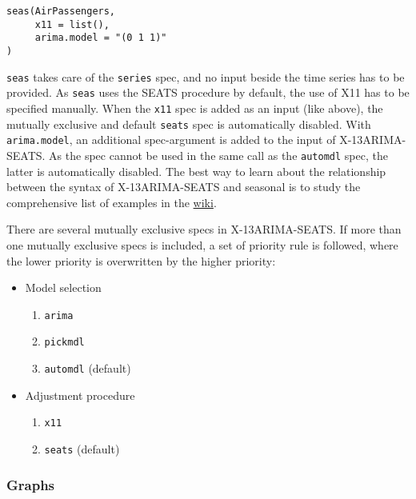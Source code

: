 \begin{verbatim}
seas(AirPassengers,
     x11 = list(),
     arima.model = "(0 1 1)"
)
\end{verbatim}

\texttt{seas} takes care of the \texttt{series} spec, and no input
beside the time series has to be provided. As \texttt{seas} uses the
SEATS procedure by default, the use of X11 has to be specified manually.
When the \texttt{x11} spec is added as an input (like above), the
mutually exclusive and default \texttt{seats} spec is automatically
disabled. With \texttt{arima.model}, an additional spec-argument is
added to the input of X-13ARIMA-SEATS. As the spec cannot be used in the
same call as the \texttt{automdl} spec, the latter is automatically
disabled. The best way to learn about the relationship between the
syntax of X-13ARIMA-SEATS and seasonal is to study the comprehensive
list of examples in the
\href{https://github.com/christophsax/seasonal/wiki/Examples-of-X-13ARIMA-SEATS-in-R}{wiki}.

There are several mutually exclusive specs in X-13ARIMA-SEATS. If more
than one mutually exclusive specs is included, a set of priority rule is
followed, where the lower priority is overwritten by the higher
priority:

\begin{itemize}
\itemsep1pt\parskip0pt
\item
  Model selection

  \begin{enumerate}
  \def\labelenumi{\arabic{enumi}.}
  \itemsep1pt\parskip0pt
  \item
    \texttt{arima}
  \item
    \texttt{pickmdl}
  \item
    \texttt{automdl} (default)
  \end{enumerate}
\item
  Adjustment procedure

  \begin{enumerate}
  \def\labelenumi{\arabic{enumi}.}
  \itemsep1pt\parskip0pt
  \item
    \texttt{x11}
  \item
    \texttt{seats} (default)
  \end{enumerate}
\end{itemize}

\subsubsection{Graphs}\label{graphs}

